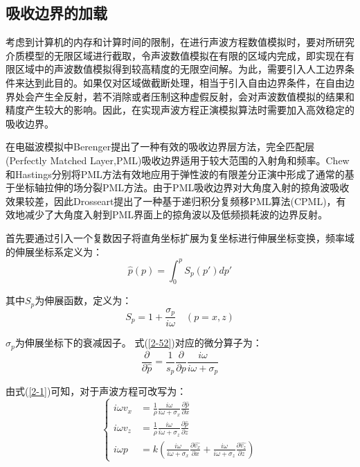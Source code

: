 \documentclass[12pt]{article}
\newcommand{\upcite}[1]{\textsuperscript{\textsuperscript{\cite{#1}}}}
\begin{document}
\subsection{吸收边界的加载}
考虑到计算机的内存和计算时间的限制，在进行声波方程数值模拟时，要对所研究介质模型的无限区域进行截取，令声波数值模拟在有限的区域内完成，即实现在有限区域中的声波数值模拟得到较高精度的无限空间解。为此，需要引入人工边界条件来达到此目的。如果仅对区域做截断处理，相当于引入自由边界条件，在自由边界处会产生全反射，若不消除或者压制这种虚假反射，会对声波数值模拟的结果和精度产生较大的影响。因此，在实现声波方程正演模拟算法时需要加入高效稳定的吸收边界。
\par
在电磁波模拟中Berenger提出了一种有效的吸收边界层方法，完全匹配层(Perfectly Matched Layer,PML)吸收边界适用于较大范围的入射角和频率\upcite{Berenger1994}。Chew和Hastings分别将PML方法有效地应用于弹性波的有限差分正演中形成了通常的基于坐标轴拉伸的场分裂PML方法\upcite{Chew1996,Hastings1996}。由于PML吸收边界对大角度入射的掠角波吸收效果较差，因此Drosseart提出了一种基于递归积分复频移PML算法(CPML)，有效地减少了大角度入射到PML界面上的掠角波以及低频损耗波的边界反射\upcite{Drossaert2007}。
\par
首先要通过引入一个复数因子将直角坐标扩展为复坐标进行伸展坐标变换，频率域的伸展坐标系定义为：
\begin{equation}\label{2-51}
\hat{p}(p)=\int_0^p S_p(p')dp'
\end{equation}
\par
其中$S_p$为伸展函数，定义为：
\begin{equation}\label{2-52}
S_p=1+\frac{\sigma_p}{i\omega}\quad (p=x,z)
\end{equation}
\par
$\sigma_p$为伸展坐标下的衰减因子。
式(\ref{2-52})对应的微分算子为：
\begin{equation}\label{2-53}
\frac{\partial}{\partial \hat{p}}=\frac{1}{s_p}\frac{\partial}{\partial p}\frac{i\omega}{i\omega+\sigma_p}
\end{equation}
\par
由式(\ref{2-1})可知，对于声波方程可改写为：
\begin{equation}\label{2-54}
\left\{ 
\begin{aligned}
i\omega v_x & = \frac{1}{\rho}\frac{i\omega}{i\omega+\sigma_x}\frac{\partial \hat{p}}{\partial x}\\
i\omega v_z & = \frac{1}{\rho}\frac{i\omega}{i\omega+\sigma_z}\frac{\partial \hat{p}}{\partial z}\\
i\omega p & = k(\frac{i\omega}{i\omega+\sigma_x}\frac{\partial \hat{v_x}}{\partial x}+\frac{i\omega}{i\omega+\sigma_z}\frac{\partial \hat{v_z}}{\partial z})
\end{aligned}
\right.
\end{equation}
\end{document}
